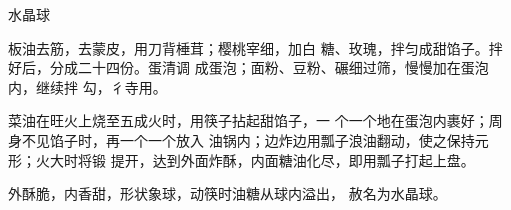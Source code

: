 \begin{recipe}{水晶球}

\ingredients


\cooking

\step 板油去筋，去蒙皮，用刀背棰茸；樱桃宰细，加白 糖、玫瑰，拌匀成甜馅子。拌好后，分成二十四份。蛋清调 成蛋泡；面粉、豆粉、碾细过筛，慢慢加在蛋泡内，继续拌 勾，彳寺用。

\step 菜油在旺火上烧至五成火时，用筷子拈起甜馅子，一 个一个地在蛋泡内裹好；周身不见馅子时，再一个一个放入 油锅内；边炸边用瓢子浪油翻动，使之保持元形；火大时将锻 提开，达到外面炸酥，内面糖油化尽，即用瓢子打起上盘。

\notes

外酥脆，内香甜，形状象球，动筷时油糖从球内溢出， 赦名为水晶球。

\end{recipe}

